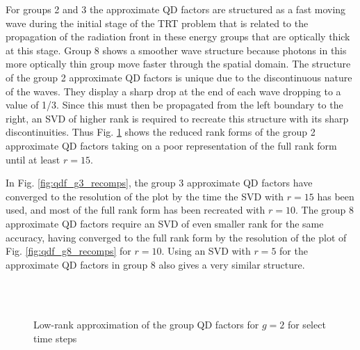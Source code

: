	\ind For groups 2 and 3 the approximate QD factors are structured as a fast moving wave during the initial stage of the TRT problem that is related to the propagation of the radiation front in these energy groups that are optically thick at this stage. Group 8 shows a smoother wave structure because photons in this more optically thin group move faster through the spatial domain. The structure of the group 2 approximate QD factors is unique due to the discontinuous nature of the waves. They display a sharp drop at the end of each wave dropping to a value of 1/3. Since this must then be propagated from the left boundary to the right, an SVD of higher rank is required to recreate this structure with its sharp discontinuities. Thus Fig. \ref{fig:qdf_g2_recomps} shows the reduced rank forms of the group 2 approximate QD factors taking on a poor representation of the full rank form until at least $r=15$.
	
	\ind In Fig. \ref{fig:qdf_g3_recomps}, the group 3 approximate QD factors have converged to the resolution of the plot by the time the SVD with $r=15$ has been used, and most of the full rank form has been recreated with $r=10$. The group 8 approximate QD factors require an SVD of even smaller rank for the same accuracy, having converged to the full rank form by the resolution of the plot of Fig. \ref{fig:qdf_g8_recomps} for $r=10$. Using an SVD with $r=5$ for the approximate QD factors in group 8 also gives a very similar structure.

	\begin{figure}[ht!]
		\centering
		\\
		\\
		\caption{\label{fig:qdf_g2_recomps}
			Low-rank approximation of the group QD factors for $g=2$ for select time steps}
	\end{figure}


